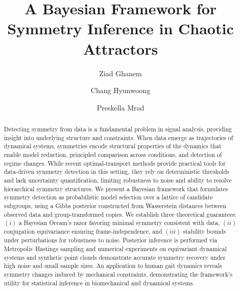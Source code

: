 \documentclass[11pt]{amsart}
\begin{document}
\title[Symmetry Inference in Chaotic Attractors]{A Bayesian Framework for Symmetry Inference in Chaotic Attractors} 

\author{ Ziad Ghanem}\address{Department of Mathematical Sciences, University of Texas at Dallas, Richardson, TX 75080, USA}

\author{Chang Hyunwoong}
\address{Department of Mathematical Sciences, University of Texas at Dallas, Richardson, TX 75080, USA}

\author{Preskella Mrad}\address{Department of Mathematical Sciences, University of Texas at Dallas, Richardson, TX 75080, USA}

\date{}

\begin{abstract}
Detecting symmetry from data is a fundamental problem in signal analysis, providing insight into underlying structure and constraints. When data emerge as trajectories of dynamical systems, symmetries encode structural properties of the dynamics that enable model reduction, principled comparison across conditions, and detection of regime changes. While recent optimal-transport methods provide practical tools for data-driven symmetry detection in this setting, they rely on deterministic thresholds and lack uncertainty quantification, limiting robustness to noise and ability to resolve hierarchical symmetry structures. We present a Bayesian framework that formulates symmetry detection as probabilistic model selection over a lattice of candidate subgroups, using a Gibbs posterior constructed from Wasserstein distances between observed data and group-transformed copies. We establish three theoretical guarantees: $(i)$ a Bayesian Occam’s razor favoring minimal symmetry consistent with data, $(ii)$ conjugation equivariance ensuring frame-independence, and $(iii)$ stability bounds under perturbations for robustness to noise. Posterior inference is performed via Metropolis–Hastings sampling and numerical experiments on equivariant dynamical systems and synthetic point clouds demonstrate accurate symmetry recovery under high noise and small sample sizes. An application to human gait dynamics reveals symmetry changes induced by mechanical constraints, demonstrating the framework's utility for statistical inference in biomechanical and dynamical systems.
\end{abstract}
\end{document}
